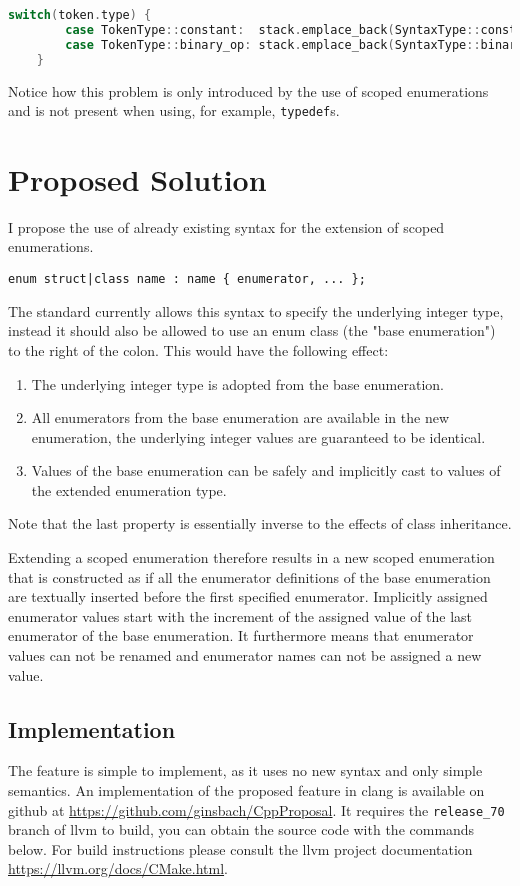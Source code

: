 \documentclass{scrartcl}
\begin{document}
{\footnotesize
\begin{lstlisting}[language=C++]
    switch(token.type) {
        case TokenType::constant:  stack.emplace_back(SyntaxType::constant);
        case TokenType::binary_op: stack.emplace_back(SyntaxType::binary_op);
    }
\end{lstlisting}}
\noindent
Notice how this problem is only introduced by the use of scoped enumerations and is not present when using, for example, \texttt{typedef}s.

\section*{Proposed Solution}
I propose the use of already existing syntax for the extension of scoped enumerations.

\begin{lstlisting}[language={}]
    enum struct|class name : name { enumerator, ... };
\end{lstlisting}

\noindent
The standard currently allows this syntax to specify the underlying integer type, instead it should also be allowed to use an enum class (the "base enumeration") to the right of the colon.
This would have the following effect:
\begin{enumerate}
\item The underlying integer type is adopted from the base enumeration.
\item All enumerators from the base enumeration are available in the new enumeration, the underlying integer values are guaranteed to be identical.
\item Values of the base enumeration can be safely and implicitly cast to values of the extended enumeration type.
\end{enumerate}
Note that the last property is essentially inverse to the effects of class inheritance.

Extending a scoped enumeration therefore results in a new scoped enumeration that is constructed as if all the enumerator definitions of the base enumeration are textually inserted before the first specified enumerator.
Implicitly assigned enumerator values start with the increment of the assigned value of the last enumerator of the base enumeration.
It furthermore means that enumerator values can not be renamed and enumerator names can not be assigned a new value.

\subsection*{Implementation}
The feature is simple to implement, as it uses no new syntax and only simple semantics.
An implementation of the proposed feature in clang is available on github at \url{https://github.com/ginsbach/CppProposal}.
It requires the \texttt{release\_70} branch of llvm to build, you can obtain the source code with the commands below.
For build instructions please consult the llvm project documentation \url{https://llvm.org/docs/CMake.html}.
\end{document}
